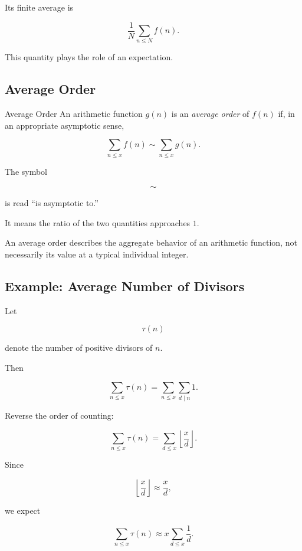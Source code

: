 Its finite average is

\[ \boxed{\frac1N\sum_{n\leq N}f(n).} \]

This quantity plays the role of an expectation.

\subsection{Average Order}
\label{subsec:average-order}

\begin{definitionbox}{Average Order}
An arithmetic function \(g(n)\) is an \emph{average order} of \(f(n)\) if,
in an appropriate asymptotic sense,

\[ \sum_{n\leq x}f(n)\sim\sum_{n\leq x}g(n). \]
\end{definitionbox}

The symbol

\[ \sim \]

is read ``is asymptotic to.''

It means the ratio of the two quantities approaches \(1\).

An average order describes the aggregate behavior of an arithmetic function,
not necessarily its value at a typical individual integer.

\subsection{Example: Average Number of Divisors}
\label{subsec:average-number-divisors}

Let

\[ \tau(n) \]

denote the number of positive divisors of \(n\).

Then

\[
\sum_{n\leq x}\tau(n)
=
\sum_{n\leq x}\sum_{d\mid n}1.
\]

Reverse the order of counting:

\[
\sum_{n\leq x}\tau(n)
=
\sum_{d\leq x}\left\lfloor\frac{x}{d}\right\rfloor.
\]

Since

\[ \left\lfloor\frac{x}{d}\right\rfloor\approx\frac{x}{d}, \]

we expect

\[
\sum_{n\leq x}\tau(n)
\approx
x\sum_{d\leq x}\frac1d.
\]

